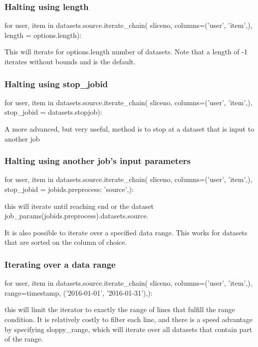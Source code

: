\subsubsection*{Halting using length}
\begin{python}
for user, item in datasets.source.iterate_chain(
    sliceno,
    columns=('user', 'item',),
    length = options.length):
\end{python}
This will iterate for options.length number of datasets.  Note that a
length of -1 iterates without bounds and is the default.


\subsubsection*{Halting using stop\_jobid}
\begin{python}
for user, item in datasets.source.iterate_chain(
    sliceno,
    columns=('user', 'item',),
    stop_jobid = datasets.stopjob):
\end{python}

A more advanced, but very useful, method is to stop at a dataset that
is input to another job

\subsubsection*{Halting using another job's input parameters}
\begin{python}
for user, item in datasets.source.iterate_chain(
    sliceno,
    columns=('user', 'item',),
    stop_jobid = {jobids.preprocess: 'source',}):
\end{python}
this will iterate until reaching end or the dataset
job\_params(jobids.preprocess).datasets.source.

It is also possible to iterate over a specified data range.  This
works for datasets that are sorted on the column of choice.

\subsubsection*{Iterating over a data range}
\begin{python}
for user, item in datasets.source.iterate_chain(
    sliceno,
    columns=('user', 'item',),
    range={timestamp, ('2016-01-01', '2016-01-31'),}):
\end{python}
this will limit the iterator to exactly the range of lines that
fulfill the range condition.  It is relatively costly to filter each
line, and there is a speed advantage by specifying sloppy\_range,
which will iterate over all datasets that contain part of the range.

